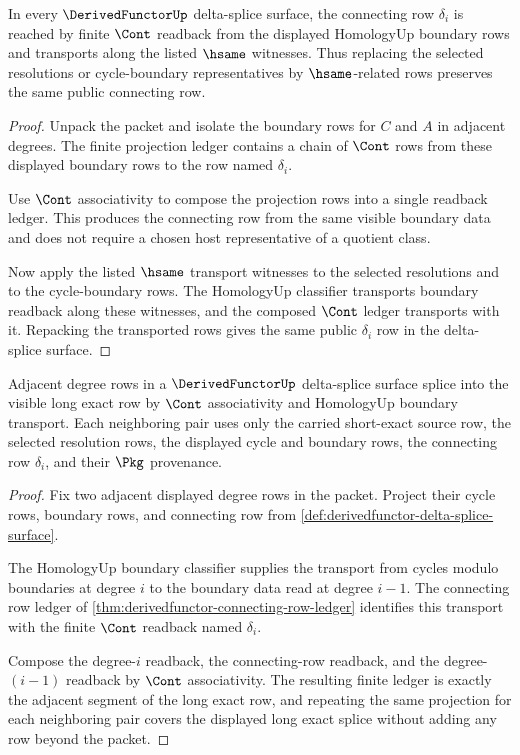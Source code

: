 \begin{theorem}\label{thm:derivedfunctor-connecting-row-ledger}
In every $\DerivedFunctorUp$ delta-splice surface, the connecting row $\delta_i$ is reached by finite $\Cont$ readback from the displayed HomologyUp boundary rows and transports along the listed $\hsame$ witnesses. Thus replacing the selected resolutions or cycle-boundary representatives by $\hsame$-related rows preserves the same public connecting row.
\end{theorem}
\begin{proof}
Unpack the packet and isolate the boundary rows for $C$ and $A$ in adjacent degrees. The finite projection ledger contains a chain of $\Cont$ rows from these displayed boundary rows to the row named $\delta_i$.

Use $\Cont$ associativity to compose the projection rows into a single readback ledger. This produces the connecting row from the same visible boundary data and does not require a chosen host representative of a quotient class.

Now apply the listed $\hsame$ transport witnesses to the selected resolutions and to the cycle-boundary rows. The HomologyUp classifier transports boundary readback along these witnesses, and the composed $\Cont$ ledger transports with it. Repacking the transported rows gives the same public $\delta_i$ row in the delta-splice surface.
\end{proof}

\begin{theorem}\label{thm:derivedfunctor-long-exact-splice-coverage}
Adjacent degree rows in a $\DerivedFunctorUp$ delta-splice surface splice into the visible long exact row by $\Cont$ associativity and HomologyUp boundary transport. Each neighboring pair uses only the carried short-exact source row, the selected resolution rows, the displayed cycle and boundary rows, the connecting row $\delta_i$, and their $\Pkg$ provenance.
\end{theorem}
\begin{proof}
Fix two adjacent displayed degree rows in the packet. Project their cycle rows, boundary rows, and connecting row from \autoref{def:derivedfunctor-delta-splice-surface}.

The HomologyUp boundary classifier supplies the transport from cycles modulo boundaries at degree $i$ to the boundary data read at degree $i-1$. The connecting row ledger of \autoref{thm:derivedfunctor-connecting-row-ledger} identifies this transport with the finite $\Cont$ readback named $\delta_i$.

Compose the degree-$i$ readback, the connecting-row readback, and the degree-$(i-1)$ readback by $\Cont$ associativity. The resulting finite ledger is exactly the adjacent segment of the long exact row, and repeating the same projection for each neighboring pair covers the displayed long exact splice without adding any row beyond the packet.
\end{proof}

